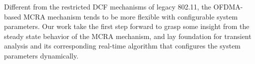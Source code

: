 \documentclass[journal]{IEEEtran}
\begin{document}
Different from the restricted DCF mechanisms of legacy 802.11, the OFDMA-based MCRA mechanism tends to be more flexible with configurable system parameters. 
Our work take the first step forward to grasp some insight from the steady state behavior of the MCRA mechanism, and lay foundation for transient analysis and its corresponding real-time algorithm that configures the system parameters dynamically.



%
%
\end{document}
